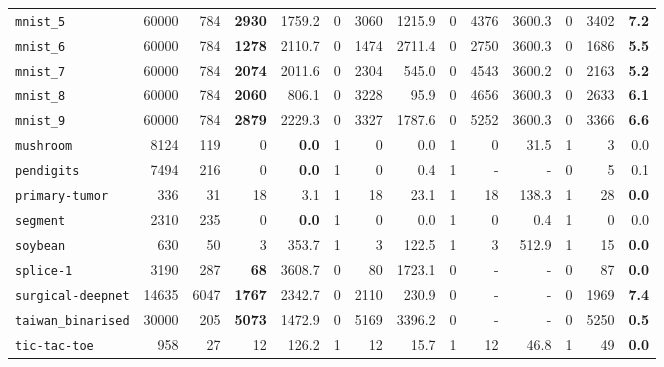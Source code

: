 \begin{tabular}{lccrrrrrrrrrrr}
\texttt{mnist\_5} & \multicolumn{1}{r}{60000} & \multicolumn{1}{r}{784}  & \textbf{2930} & 1759.2 & 0 & 3060 & 1215.9 & 0 & 4376 & 3600.3 & 0 & 3402 & \textbf{7.2}\\
\texttt{mnist\_6} & \multicolumn{1}{r}{60000} & \multicolumn{1}{r}{784}  & \textbf{1278} & 2110.7 & 0 & 1474 & 2711.4 & 0 & 2750 & 3600.3 & 0 & 1686 & \textbf{5.5}\\
\texttt{mnist\_7} & \multicolumn{1}{r}{60000} & \multicolumn{1}{r}{784}  & \textbf{2074} & 2011.6 & 0 & 2304 & 545.0 & 0 & 4543 & 3600.2 & 0 & 2163 & \textbf{5.2}\\
\texttt{mnist\_8} & \multicolumn{1}{r}{60000} & \multicolumn{1}{r}{784}  & \textbf{2060} & 806.1 & 0 & 3228 & 95.9 & 0 & 4656 & 3600.3 & 0 & 2633 & \textbf{6.1}\\
\texttt{mnist\_9} & \multicolumn{1}{r}{60000} & \multicolumn{1}{r}{784}  & \textbf{2879} & 2229.3 & 0 & 3327 & 1787.6 & 0 & 5252 & 3600.3 & 0 & 3366 & \textbf{6.6}\\
\texttt{mushroom} & \multicolumn{1}{r}{8124} & \multicolumn{1}{r}{119}  & 0 & \textbf{0.0} & 1 & 0 & 0.0 & 1 & 0 & 31.5 & 1 & 3 & 0.0\\
\texttt{pendigits} & \multicolumn{1}{r}{7494} & \multicolumn{1}{r}{216}  & 0 & \textbf{0.0} & 1 & 0 & 0.4 & 1 & - & - & 0 & 5 & 0.1\\
\texttt{primary-tumor} & \multicolumn{1}{r}{336} & \multicolumn{1}{r}{31}  & 18 & 3.1 & 1 & 18 & 23.1 & 1 & 18 & 138.3 & 1 & 28 & \textbf{0.0}\\
\texttt{segment} & \multicolumn{1}{r}{2310} & \multicolumn{1}{r}{235}  & 0 & \textbf{0.0} & 1 & 0 & 0.0 & 1 & 0 & 0.4 & 1 & 0 & 0.0\\
\texttt{soybean} & \multicolumn{1}{r}{630} & \multicolumn{1}{r}{50}  & 3 & 353.7 & 1 & 3 & 122.5 & 1 & 3 & 512.9 & 1 & 15 & \textbf{0.0}\\
\texttt{splice-1} & \multicolumn{1}{r}{3190} & \multicolumn{1}{r}{287}  & \textbf{68} & 3608.7 & 0 & 80 & 1723.1 & 0 & - & - & 0 & 87 & \textbf{0.0}\\
\texttt{surgical-deepnet} & \multicolumn{1}{r}{14635} & \multicolumn{1}{r}{6047}  & \textbf{1767} & 2342.7 & 0 & 2110 & 230.9 & 0 & - & - & 0 & 1969 & \textbf{7.4}\\
\texttt{taiwan\_binarised} & \multicolumn{1}{r}{30000} & \multicolumn{1}{r}{205}  & \textbf{5073} & 1472.9 & 0 & 5169 & 3396.2 & 0 & - & - & 0 & 5250 & \textbf{0.5}\\
\texttt{tic-tac-toe} & \multicolumn{1}{r}{958} & \multicolumn{1}{r}{27}  & 12 & 126.2 & 1 & 12 & 15.7 & 1 & 12 & 46.8 & 1 & 49 & \textbf{0.0}\\

\end{tabular}
